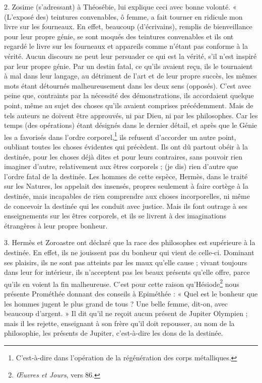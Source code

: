 \documentclass[a4paper, 11pt, oneside, polutonikogreek, french]{article}
\begin{document}
2. Zosime (s'adressant) à Théosébie, lui explique ceci avec bonne volonté. « (L'exposé des) teintures convenables, ô femme, a fait tourner en ridicule mon livre sur les fourneaux. En effet, beaucoup (d'écrivains), remplis de bienveillance pour leur propre génie, se sont moqués des teintures convenables et ils ont regardé le livre sur les fourneaux et appareils comme n'étant pas conforme à la vérité. Aucun discours ne peut leur persuader ce qui est la vérité, s'il n'est inspiré par leur propre génie. Par un destin fatal, ce qu'ils avaient reçu, ils le tournaient à mal dans leur langage, au détriment de l'art et de leur propre succès, les mêmes mots étant détournés malheureusement dans les deux sens (opposés). C'est avec peine que, contraints par la nécessité des démonstrations, ils accordaient quelque point, même au sujet des choses qu'ils avaient comprises précédemment. Mais de tels auteurs ne doivent être approuvés, ni par Dieu, ni par les philosophes. Car les temps (des opérations) étant désignés dans le dernier détail, et après que le Génie les a favorisés dans l'ordre corporel,\footnote{C'est-à-dire dans l'opération de la régénération des corps métalliques.} ils refusent d'accorder un autre point, oubliant toutes les choses évidentes qui précèdent. Ils ont dû partout obéir à la destinée, pour les choses déjà dites et pour leurs contraires, sans pouvoir rien imaginer d'autre, relativement aux êtres corporels ; (je dis) rien d'autre que l'ordre fatal de la destinée. Les hommes de cette espèce, Hermès, dans le traité sur les Natures, les appelait des insensés, propres seulement à faire cortège à la destinée, mais incapables de rien comprendre aux choses incorporelles, ni même de concevoir la destinée qui les conduit avec justice. Mais ils font outrage à ses enseignements sur les êtres corporels, et ils se livrent à des imaginations étrangères à leur propre bonheur.

3. Hermès et Zoroastre ont déclaré que la race des philosophes est supérieure à la destinée. En effet, ils ne jouissent pas du bonheur qui vient de celle-ci. Dominant ses plaisirs, ils ne sont pas atteints par les maux qu'elle cause ; vivant toujours dans leur for intérieur, ils n'acceptent pas les beaux présents qu'elle offre, parce qu'ils en voient la fin malheureuse. C'est pour cette raison qu'Hésiode\footnote{\emph{Œuvres et Jours}, vers 86.} nous présente Prométhée donnant des conseils à Epiméthée : « Quel est le bonheur que les hommes jugent le plus grand de tous ? Une belle femme, dit-on, avec beaucoup d'argent. » Il dit qu'il ne reçoit aucun présent de Jupiter Olympien ; mais il les rejette, enseignant à son frère qu'il doit repousser, au nom de la philosophie, les présents de Jupiter, c'est-à-dire les dons de la destinée.
\end{document}
